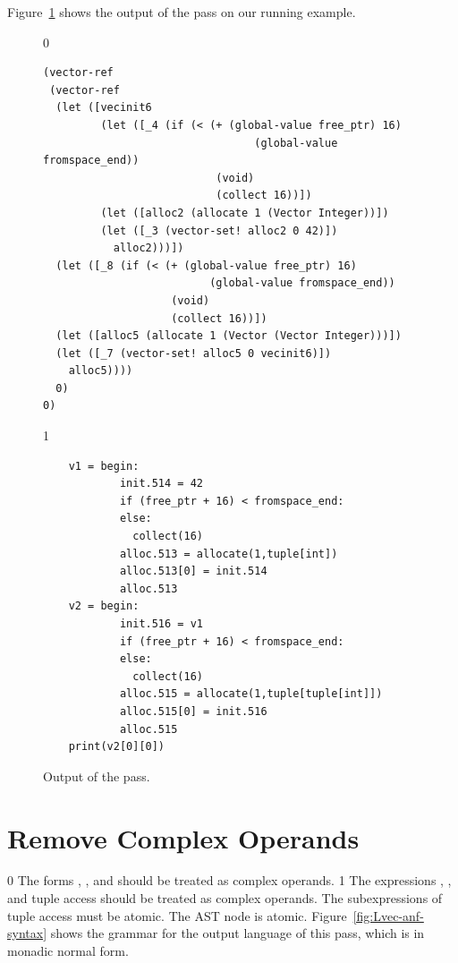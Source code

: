 \documentclass[7x10]{TimesAPriori_MIT}%
\def\racketEd{0}
\def\pythonEd{1}
\def\edition{1}
\newcommand{\pythonColor}[0]{}
\numberwithin{theorem}{chapter}
\numberwithin{definition}{chapter}
\numberwithin{equation}{chapter}
\begin{document}
Figure~\ref{fig:expose-alloc-output} shows the output of the
 pass on our running example.

\begin{figure}[tbp]
  \begin{tcolorbox}[colback=white]
{\if\edition\racketEd
\begin{lstlisting}
(vector-ref
 (vector-ref
  (let ([vecinit6
         (let ([_4 (if (< (+ (global-value free_ptr) 16)
                                 (global-value fromspace_end))
                           (void)
                           (collect 16))])
         (let ([alloc2 (allocate 1 (Vector Integer))])
         (let ([_3 (vector-set! alloc2 0 42)])
           alloc2)))])
  (let ([_8 (if (< (+ (global-value free_ptr) 16)
                          (global-value fromspace_end))
                    (void)
                    (collect 16))])
  (let ([alloc5 (allocate 1 (Vector (Vector Integer)))])
  (let ([_7 (vector-set! alloc5 0 vecinit6)])
    alloc5))))
  0)
0)
\end{lstlisting}
\fi}
{\if\edition\pythonEd\pythonColor
\begin{lstlisting}
    v1 = begin:
            init.514 = 42
            if (free_ptr + 16) < fromspace_end:
            else:
              collect(16)
            alloc.513 = allocate(1,tuple[int])
            alloc.513[0] = init.514
            alloc.513
    v2 = begin:
            init.516 = v1
            if (free_ptr + 16) < fromspace_end:
            else:
              collect(16)
            alloc.515 = allocate(1,tuple[tuple[int]])
            alloc.515[0] = init.516
            alloc.515
    print(v2[0][0])
\end{lstlisting}
\fi}
  \end{tcolorbox}
\caption{Output of the  pass.}
\label{fig:expose-alloc-output}
\end{figure}


\section{Remove Complex Operands}
\label{sec:remove-complex-opera-Lvec}

{\if\edition\racketEd
%
The forms , , and 
should be treated as complex operands.
%
\fi}
%
{\if\edition\pythonEd\pythonColor
%
The expressions , ,
and tuple access should be treated as complex operands.  The
subexpressions of tuple access must be atomic.
The  AST node is atomic.
%
\fi}
Figure~\ref{fig:Lvec-anf-syntax}
shows the grammar for the output language \LangAllocANF{} of this
pass, which is \LangAlloc{} in monadic normal form.
\end{document}

